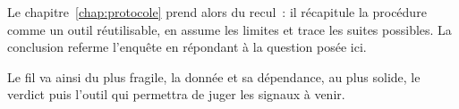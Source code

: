 Le chapitre~\ref{chap:protocole} prend alors du recul~: il récapitule la
procédure comme un outil réutilisable, en assume les limites et trace les
suites possibles. La conclusion referme l'enquête en répondant à la question
posée ici.

Le fil va ainsi du plus fragile, la donnée et sa dépendance, au plus solide,
le verdict puis l'outil qui permettra de juger les signaux à venir.

